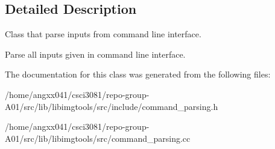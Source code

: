 \subsection{Detailed Description}
Class that parse inputs from command line interface. 

Parse all inputs given in command line interface. 

The documentation for this class was generated from the following files\+:\begin{DoxyCompactItemize}
\item 
/home/angxx041/csci3081/repo-\/group-\/\+A01/src/lib/libimgtools/src/include/command\+\_\+parsing.\+h\item 
/home/angxx041/csci3081/repo-\/group-\/\+A01/src/lib/libimgtools/src/command\+\_\+parsing.\+cc\end{DoxyCompactItemize}
